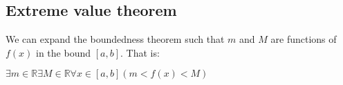 
\subsection{Extreme value theorem}

We can expand the boundedness theorem such that \(m\) and \(M\) are functions of \(f(x)\) in the bound \([a,b]\). That is:

\(\exists m \in \mathbb{R} \exists M\in \mathbb{R}\forall x\in [a,b](m<f(x)<M)\)

